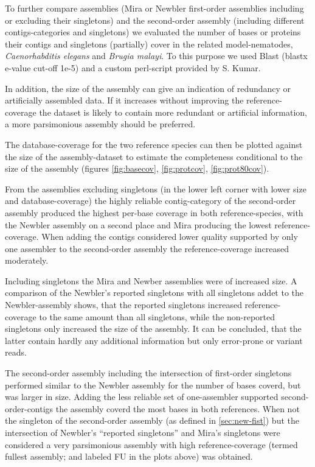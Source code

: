 \documentclass[12pt,a4paper]{article}
\begin{document}
To further compare assemblies (Mira or Newbler first-order assemblies
including or excluding their singletons) and the second-order assembly
(including different contigs-categories and singletons) we evaluated
the number of bases or proteins their contigs and singletons
(partially) cover in the related model-nematodes,
\textit{Caenorhabditis elegans} and \textit{Brugia malayi}. To this
purpose we used Blast (blastx e-value cut-off 1e-5) and a custom
perl-script provided by S. Kumar.

In addition, the size of the assembly can give an indication of
redundancy or artificially assembled data. If it increases without
improving the reference-coverage the dataset is likely to contain more
redundant or artificial information, a more parsimonious assembly
should be preferred.



The database-coverage for the two reference species can then be
plotted against the size of the assembly-dataset to estimate the
completeness conditional to the size of the assembly (figures
\ref{fig:basecov}, \ref{fig:protcov}, \ref{fig:prot80cov}).

From the assemblies excluding singletons (in the lower left corner
with lower size and database-coverage) the highly reliable
contig-category of the second-order assembly produced the highest
per-base coverage in both reference-species, with the Newbler assembly
on a second place and Mira producing the lowest
reference-coverage. When adding the contigs considered lower quality
supported by only one assembler to the second-order assembly the
reference-coverage increased moderately.

Including singletons the Mira and Newber assemblies were of increased
size. A comparison of the Newbler's reported singletons with all
singletons addet to the Newbler-assembly shows, that the reported
singletons increased reference-coverage to the same amount than all
singletons, while the non-reported singletons only increased the size
of the assembly. It can be concluded, that the latter contain hardly
any additional information but only error-prone or variant reads.

The second-order assembly including the intersection of first-order
singletons performed similar to the Newbler assembly for the number of
bases coverd, but was larger in size. Adding the less reliable set of
one-assembler supported second-order-contigs the assembly coverd the
most bases in both references. When not the singleton of the
second-order assembly (as defined in \ref{sec:new-fist}) but the
intersection of Newbler's ``reported singletons'' and Mira's
singletons were considered a very parsimonious assembly with high
reference-coverage (termed fullest assembly; and labeled FU in the
plots above) was obtained.
\end{document}
